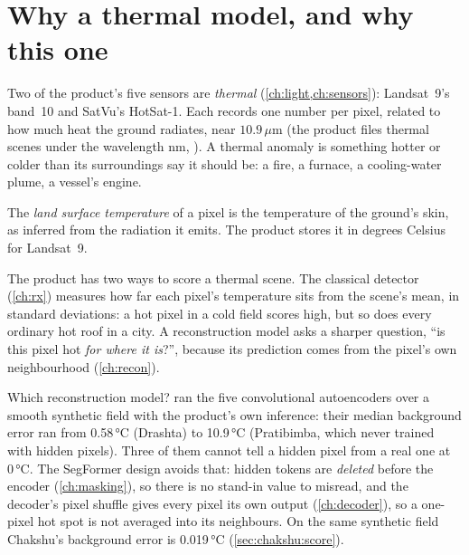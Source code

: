 \section{Why a thermal model, and why this one}\label{sec:chakshu:why}

Two of the product's five sensors are \emph{thermal} (\cref{ch:light,ch:sensors}): Landsat~9's band~10 and
SatVu's HotSat-1. Each records one number per pixel, related to how much heat the ground radiates, near
$10.9\,\mu$m (the product files thermal scenes under the wavelength  nm,
). A thermal anomaly is something hotter or colder than
its surroundings say it should be: a fire, a furnace, a cooling-water plume, a vessel's engine.

\begin{definition}
The \emph{land surface temperature} of a pixel is the temperature of the ground's
skin, as inferred from the radiation it emits. The product stores it in degrees Celsius for Landsat~9.
\end{definition}

The product has two ways to score a thermal scene. The classical  detector (\cref{ch:rx}) measures
how far each pixel's temperature sits from the scene's mean, in standard deviations: a hot pixel in a cold field
scores high, but so does every ordinary hot roof in a city. A reconstruction model asks a sharper question, ``is
this pixel hot \emph{for where it is}?'', because its prediction comes from the pixel's own neighbourhood
(\cref{ch:recon}).

Which reconstruction model?  ran the five convolutional autoencoders over a smooth synthetic field with the
product's own inference: their median background error ran from 0.58\,°C (Drashta) to 10.9\,°C (Pratibimba, which
never trained with hidden pixels). Three of them cannot tell a hidden pixel from a real one at 0\,°C. The SegFormer
design avoids that: hidden tokens are \emph{deleted} before the encoder (\cref{ch:masking}), so there is no stand-in
value to misread, and the decoder's pixel shuffle gives every pixel its own output (\cref{ch:decoder}), so a
one-pixel hot spot is not averaged into its neighbours. On the same synthetic field Chakshu's background error is 0.019\,°C (\cref{sec:chakshu:score}).

